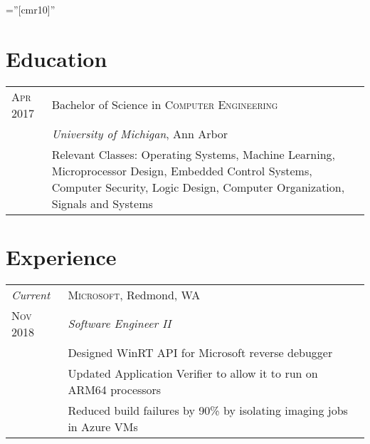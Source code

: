 \documentclass[a4paper,12pt]{article} %
\begin{document}
\pagestyle{empty} %

\font\fb=''[cmr10]'' %


\par{\par}
\par{\par}


\section{Education}

\begin{tabular}{R{2.1cm}|p{14cm}}
\hspace{4pt}\textsc{Apr} 2017 & Bachelor of Science in
 \textsc{Computer Engineering} \\
& \normalsize\emph{University of Michigan}, Ann Arbor \\
& \footnotesize{Relevant Classes: Operating Systems, Machine Learning,
  Microprocessor Design, Embedded Control Systems, Computer Security,
  Logic Design, Computer Organization, Signals and Systems}\\
\end{tabular}


\section{Experience}

\begin{tabular}{R{2.1cm}|p{14cm}}
\emph{Current} & \textsc{Microsoft}, Redmond, WA \\
\textsc{Nov 2018} & \emph{Software Engineer II} \\
& \footnotesize{Designed WinRT API for Microsoft reverse debugger} \\
& \footnotesize{Updated Application Verifier to allow it to run on ARM64 processors} \\
& \footnotesize{Reduced build failures by 90\% by isolating imaging jobs in
  Azure VMs} \\
\end{tabular}
\end{document}
